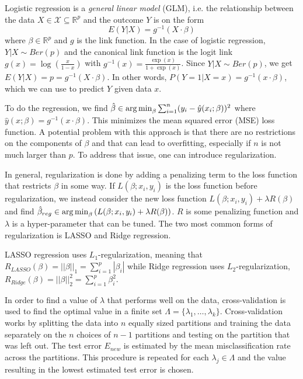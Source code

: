 \documentclass[../../project.tex]{subfiles}
\begin{document}
	Logistic regression is a \textit{general linear model} (GLM), i.e. the relationship between the data $X \in \mathcal{X} \subseteq \mathbb{R}^p$ and the outcome $Y$ is on the form
	\begin{equation}
	E(Y|X) = g^{-1}(X \cdot \beta)
	\end{equation}
	where $\beta \in \mathbb{R}^p$ and $g$ is the link function. In the case of logistic regression, $Y|X \sim Ber(p)$ and the canonical link function is the logit link $g(x) = \log \left( \frac{x}{1 - x} \right)$ with $g^{-1}(x) = \frac{\exp(x)}{1 + \exp(x)}$. Since $Y|X \sim Ber(p)$, we get $E(Y|X) = p = g^{-1}(X \cdot \beta)$. In other words, $P(Y = 1 | X = x) = g^{-1}(x \cdot \beta)$, which we can use to predict $Y$ given data $x$.
	
	To do the regression, we find $\hat \beta \in \operatorname*{arg\,min}_\beta \sum_{i=1}^{n} (y_i - \hat y(x_i; \beta))^2$ where $\hat y(x;\beta) = g^{-1} (x \cdot \beta)$. This minimizes the mean squared error (MSE) loss function. A potential problem with this approach is that there are no restrictions on the components of $\beta$ and that can lead to overfitting, especially if $n$ is not much larger than $p$. To address that issue, one can introduce regularization.
	
	In general, regularization is done by adding a penalizing term to the loss function that restricts $\beta$ in some way. If $L(\beta; x_i,y_i)$ is the loss function before regularization, we instead consider the new loss function $L(\beta; x_i,y_i) + \lambda R(\beta)$ and find $\hat \beta_{reg} \in \operatorname*{arg\,min}_\beta \left( L(\beta; x_i, y_i) + \lambda R(\beta) \right)$. $R$ is some penalizing function and $\lambda$ is a hyper-parameter that can be tuned. The two most common forms of regularization is LASSO and Ridge regression.
	
	LASSO regression uses $L_1$-regularization, meaning that $R_{LASSO}(\beta) = ||\beta||_1 =  \sum_{i=1}^{p} |\beta_i|$ while Ridge regression uses $L_2$-regularization, $R_{Ridge}(\beta) = ||\beta||_2^2 = \sum_{i=1}^{p} \beta_i^2$.
	
	In order to find a value of $\lambda$ that performs well on the data, cross-validation is used to find the optimal value in a finite set $\Lambda = \{ \lambda_1,\dots,\lambda_k \}$. Cross-validation works by splitting the data into $n$ equally sized partitions and training the data separately on the $n$ choices of $n-1$ partitions and testing on the partition that was left out. The test error $E_{new}$ is estimated by the mean misclassification rate across the partitions. This procedure is repeated for each $\lambda_j \in \Lambda$ and the value resulting in the lowest estimated test error is chosen.
	
\end{document}
